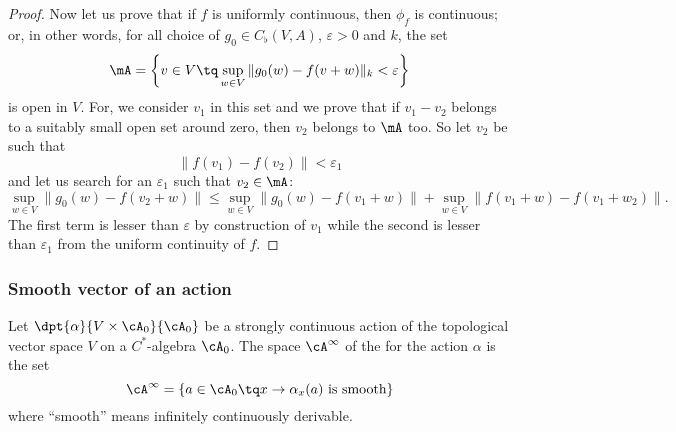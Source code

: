 \begin{proof}
Now let us prove that if $f$ is uniformly continuous, then $\phi_f$ is continuous; or, in other words, for all choice of $g_0\in C_{\flat}(V,A)$, $\varepsilon>0$ and $k$, the set
\begin{equation}
\mA=\left\{ v\in V\tq \sup_{w\in V}\| g_0(w)-f(v+w) \|_k<\varepsilon \right\}
\end{equation}
is open in $V$. For, we consider $v_1$ in this set and we prove that if $v_1-v_2$ belongs to a suitably small open set around zero, then $v_2$ belongs to $\mA$ too. So let $v_2$ be such that
\[ 
  \| f(v_1)-f(v_2) \|<\varepsilon_1
\]
and let us search for an $\varepsilon_1$ such that $v_2\in\mA$:
\begin{equation}
   \sup_{w\in V}\| g_0(w)-f(v_2+w) \|\leq \sup_{w\in V}\| g_0(w)-f(v_1+w) \|+\sup_{w\in V}\| f(v_1+w)-f(v_1+w_2) \|.
\end{equation}
The first term is lesser than $\varepsilon$ by construction of $v_1$ while the second is lesser than $\varepsilon_1$ from the uniform continuity of $f$.

\end{proof}

\subsubsection{Smooth vector of an action}

Let $\dpt{\alpha}{V\times\cA_0}{\cA_0}$ be a strongly continuous action of the topological vector space $V$ on a $C^*$-algebra $\cA_0$. The space $\cA^{\infty}$ of the  for the action $\alpha$ is the set
\begin{equation}
  \cA^{\infty}=\{ a\in\cA_0\tq x\to\alpha_x(a)\textrm{ is smooth} \}
\end{equation}
where ``smooth'' means infinitely continuously derivable.

